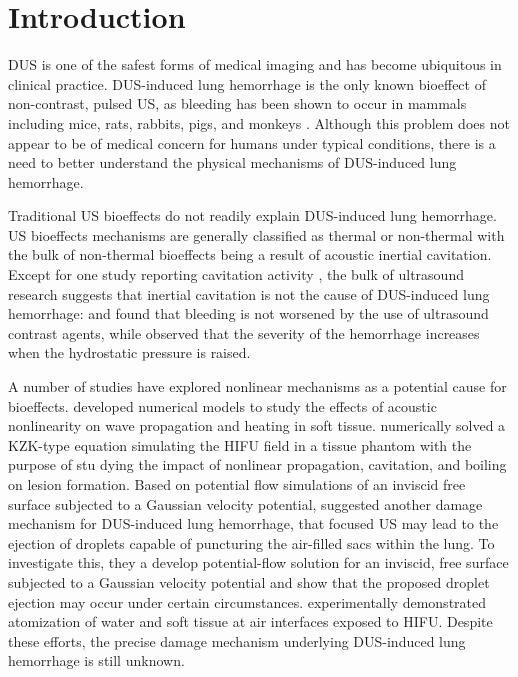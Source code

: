 \documentclass{jfm}%
\begin{document}
\begin{keywords}
\end{keywords}

\section{Introduction}%
\label{sec:introduction}%
% 
\ac{DUS} is one of the safest forms of medical imaging and has become
ubiquitous in clinical practice. \ac{DUS}-induced lung hemorrhage is
the only known bioeffect of non-contrast, pulsed \ac{US}, as bleeding
has been shown to occur in mammals including mice, rats, rabbits,
pigs, and monkeys
\citep{Child1990,OBrien2006a,Tarantal1994a,Miller2012}. Although this
problem does not appear to be of medical concern for humans under
typical conditions, there is a need to better understand the physical
mechanisms of \ac{DUS}-induced lung hemorrhage.

Traditional \ac{US} bioeffects do not readily explain \ac{DUS}-induced
lung hemorrhage. \ac{US} bioeffects mechanisms are generally
classified as thermal or non-thermal with the bulk of non-thermal
bioeffects being a result of acoustic inertial cavitation. Except for
one study reporting cavitation activity \citep{Holland1996}, the bulk
of ultrasound research suggests that inertial cavitation is not the
cause of \ac{DUS}-induced lung hemorrhage: \cite{Raeman1996} and
\cite{OBrien2004} found that bleeding is not worsened by the use of
ultrasound contrast agents, while \cite{OBrien2000} observed that the
severity of the hemorrhage increases when the hydrostatic pressure is
raised.

A number of studies have explored nonlinear mechanisms as a potential
cause for bioeffects. \cite{Filonenko2001} developed numerical models
to study the effects of acoustic nonlinearity on wave propagation and
heating in soft tissue. \cite{Khokhlova2006} numerically solved a
KZK-type equation simulating the \ac{HIFU} field in a tissue phantom
with the purpose of stu dying the impact of nonlinear propagation,
cavitation, and boiling on lesion formation. Based on potential flow
simulations of an inviscid free surface subjected to a Gaussian
velocity potential, \cite{Tjan2007} suggested another damage mechanism
for \ac{DUS}-induced lung hemorrhage, that focused \ac{US} may lead to
the ejection of droplets capable of puncturing the air-filled sacs
within the lung. To investigate this, they a develop potential-flow
solution for an inviscid, free surface subjected to a Gaussian
velocity potential and show that the proposed droplet ejection may
occur under certain circumstances. \cite{Simon2012} experimentally
demonstrated atomization of water and soft tissue at air interfaces
exposed to \ac{HIFU}. Despite these efforts, the precise damage mechanism
underlying \ac{DUS}-induced lung hemorrhage is still unknown.
\end{document}
